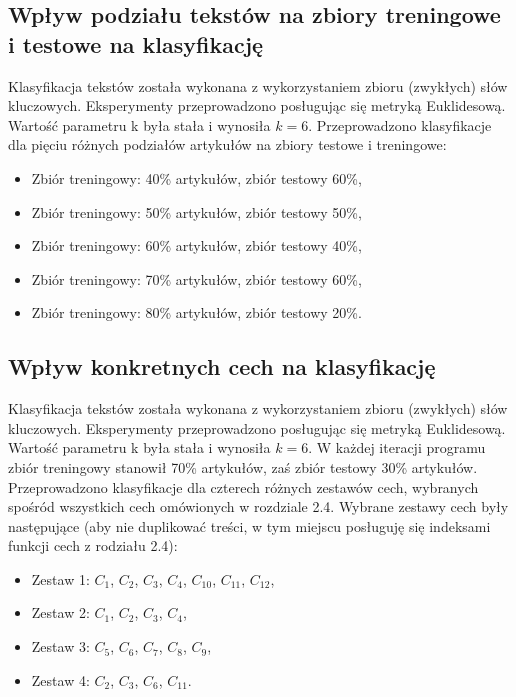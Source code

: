\documentclass{classrep}
\begin{document}
\subsection{Wpływ podziału tekstów na zbiory treningowe i testowe na klasyfikację}
Klasyfikacja tekstów została wykonana z wykorzystaniem zbioru (zwykłych) słów kluczowych. Eksperymenty przeprowadzono posługując się metryką Euklidesową. Wartość parametru k była stała i wynosiła $k=6$. Przeprowadzono klasyfikacje dla pięciu różnych podziałów artykułów na zbiory testowe i treningowe: 
\begin{itemize}[label=$\bullet$\scshape\bfseries]

\item Zbiór treningowy: 40\% artykułów, zbiór testowy 60\%,
\item Zbiór treningowy: 50\% artykułów, zbiór testowy 50\%,
\item Zbiór treningowy: 60\% artykułów, zbiór testowy 40\%,
\item Zbiór treningowy: 70\% artykułów, zbiór testowy 60\%,
\item Zbiór treningowy: 80\% artykułów, zbiór testowy 20\%.

\end{itemize}

\subsection{Wpływ konkretnych cech na klasyfikację}
Klasyfikacja tekstów została wykonana z wykorzystaniem zbioru (zwykłych) słów kluczowych. Eksperymenty przeprowadzono posługując się metryką Euklidesową. Wartość parametru k była stała i wynosiła $k=6$. W każdej iteracji programu zbiór treningowy stanowił 70\% artykułów, zaś zbiór testowy 30\% artykułów. Przeprowadzono klasyfikacje dla czterech różnych zestawów cech, wybranych spośród wszystkich cech omówionych w rozdziale 2.4. Wybrane zestawy cech były następujące (aby nie duplikować treści, w tym miejscu posługuję się indeksami funkcji cech z rodziału 2.4):
\begin{itemize}[label=$\bullet$\scshape\bfseries]

\item Zestaw 1: $C_{1}$,  $C_{2}$,  $C_{3}$,  $C_{4}$,  $C_{10}$,  $C_{11}$,  $C_{12}$,
\item Zestaw 2: $C_{1}$,  $C_{2}$,  $C_{3}$,  $C_{4}$,
\item Zestaw 3: $C_{5}$,  $C_{6}$,  $C_{7}$,  $C_{8}$,  $C_{9}$,
\item Zestaw 4: $C_{2}$,  $C_{3}$,  $C_{6}$,  $C_{11}$.
\end{itemize}
\end{document}
